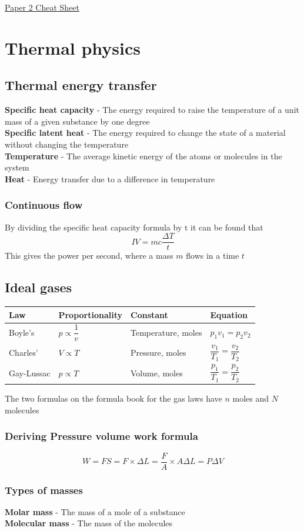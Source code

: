 \documentclass[12pt]{article}
\begin{document}
\begin{center}
\underline{\huge Paper 2 Cheat Sheet}
\end{center}
\section{Thermal physics}
\subsection{Thermal energy transfer}
\textbf{Specific heat capacity} - The energy required to raise the temperature of a unit mass of a given substance by one degree\\
\textbf{Specific latent heat}  - The energy required to change the state of a material without changing the temperature\\
\textbf{Temperature} - The average kinetic energy of the atoms or molecules in the system\\
\textbf{Heat} - Energy transfer due to a difference in temperature
\subsubsection{Continuous flow}
By dividing the specific heat capacity formula by t it can be found that
$$IV=mc\frac{\Delta T}{t}$$
This gives the power per second, where a mass $m$ flows in a time $t$
\subsection{Ideal gases}
{\renewcommand{\arraystretch}{2}
\begin{tabularx}{\textwidth}{|X|X|X|X|}
\hline
Law&Proportionality&Constant&Equation\\
\hline
Boyle's&$p\propto\dfrac{1}{v}$&Temperature, moles&$p_1v_1=p_2v_2$\\
\hline
Charles'&$V\propto T$&Pressure, moles&$\dfrac{v_1}{T_1}=\dfrac{v_2}{T_2}$\\
\hline
Gay-Lussac&$p\propto T$&Volume, moles&$\dfrac{p_1}{T_1}=\dfrac{p_2}{T_2}$\\
\hline
\end{tabularx}}
The two formulas on the formula book for the gas laws have $n$ moles and $N$ molecules
\subsubsection{Deriving Pressure volume work formula}
$$W=FS=F\times\Delta L=\frac{F}{A}\times A\Delta L=P\Delta V$$
\subsubsection{Types of masses}
\textbf{Molar mass} - The mass of a mole of a substance\\
\textbf{Molecular mass} - The mass of the molecules
\newpage
\end{document}
